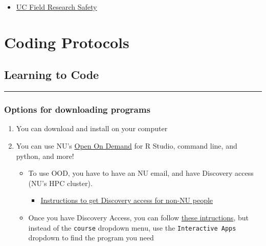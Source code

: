 \documentclass[
  letterpaper,
  DIV=11,
  numbers=noendperiod]{scrreprt}
\providecommand{\tightlist}{%
  \setlength{\itemsep}{0pt}\setlength{\parskip}{0pt}}\usepackage{longtable,booktabs,array}
\begin{document}
\begin{itemize}
\tightlist
\item
  \href{https://www.ucop.edu/safety-and-loss-prevention/_files/field-research-safety/uc-field-research-safety-manual.pdf}{UC
  Field Research Safety}
\end{itemize}

\part{Coding Protocols}

\hypertarget{learning-to-code}{%
\chapter{Learning to Code}\label{learning-to-code}}

\begin{center}\rule{0.5\linewidth}{0.5pt}\end{center}

\hypertarget{options-for-downloading-programs}{%
\section{Options for downloading
programs}\label{options-for-downloading-programs}}

\begin{enumerate}
\def\labelenumi{\arabic{enumi}.}
\item
  You can download and install on your computer
\item
  You can use NU's
  \href{https://drk-lo.github.io/lotterhoslabprotocols/code_LearningToCode/ood.discovery.neu.edu}{Open
  On Demand} for R Studio, command line, and python, and more!

  \begin{itemize}
  \item
    To use OOD, you have to have an NU email, and have Discovery access
    (NU's HPC cluster).

    \begin{itemize}
    \tightlist
    \item
      \href{https://drk-lo.github.io/lotterhoslabprotocols/discovery_nonNEUpersonnel/}{Instructions
      to get Discovery access for non-NU people}
    \end{itemize}
  \item
    Once you have Discovery Access, you can follow
    \href{https://docs.google.com/document/d/1sJAnQXE8-r_4ssr5VfVv0oZKFrrrRFxspdxx2kNdaLI/edit\#heading=h.61692qeq0wnf}{these
    intructions}, but instead of the \texttt{course} dropdown menu, use
    the \texttt{Interactive\ Apps} dropdown to find the program you need
  \end{itemize}
\end{enumerate}
\end{document}
